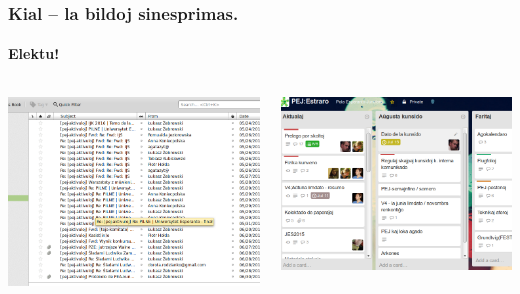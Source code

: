   \begin{frame}
    \frametitle{Kial -- la bildoj sinesprimas.}
    \framesubtitle{Elektu!}
    
	\begin{columns}
	    \begin{center}
    		\includegraphics[scale=0.2]{ekranoj/retposhto}
    	\end{center}
    	\begin{center}
    	\includegraphics[scale=0.22]{ekranoj/trello-bonas-estraro}
    	\end{center}

	\end{columns}
  \end{frame}



